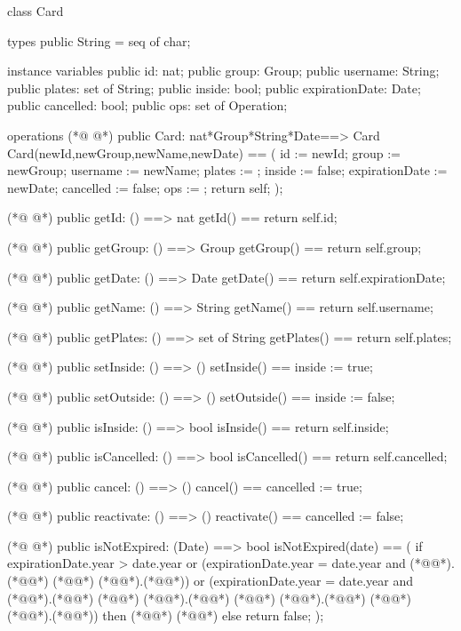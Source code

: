 \begin{vdmpp}[breaklines=true]
class Card

types
public String = seq of char;

instance variables
public id: nat;
public group: Group;
public username: String;
public plates: set of String;
public inside: bool;
public expirationDate: Date;
public cancelled: bool;
public ops: set of Operation;

operations
(*@
\label{Card:17}
@*)
public Card: nat*Group*String*Date==> Card
 Card(newId,newGroup,newName,newDate) == (
  id := newId;
  group := newGroup;
  username := newName;
  plates := {};
  inside := false;
  expirationDate := newDate;
  cancelled := false;
  ops := {};
  return self;
 );
 
(*@
\label{getId:30}
@*)
public getId: () ==> nat
 getId() == return self.id;
 
(*@
\label{getGroup:33}
@*)
public getGroup: () ==> Group
 getGroup() == return self.group;
 
(*@
\label{getDate:36}
@*)
public getDate: () ==> Date
 getDate() == return self.expirationDate;
 
(*@
\label{getName:39}
@*)
public getName: () ==> String
 getName() == return self.username;

(*@
\label{getPlates:42}
@*)
public getPlates: () ==> set of String
 getPlates() == return self.plates;
 
(*@
\label{setInside:45}
@*)
public setInside: () ==> ()
 setInside() == inside := true;
 
(*@
\label{setOutside:48}
@*)
public setOutside: () ==> ()
 setOutside() == inside := false; 
 
(*@
\label{isInside:51}
@*)
public isInside: () ==> bool
 isInside() == return self.inside;
 
(*@
\label{isCancelled:54}
@*)
public isCancelled: () ==> bool
 isCancelled() == return self.cancelled;
 
(*@
\label{cancel:57}
@*)
public cancel: () ==> ()
 cancel() == cancelled := true;
 
(*@
\label{reactivate:60}
@*)
public reactivate: () ==> ()
 reactivate() == cancelled := false;
 
(*@
\label{isNotExpired:63}
@*)
public isNotExpired: (Date) ==> bool
 isNotExpired(date) == (
  if expirationDate.year > date.year or
  (expirationDate.year = date.year and (*@@*).(*@@*) (*@\vdmnotcovered{>}@*) (*@@*).(*@@*)) or
  (expirationDate.year = date.year and (*@@*).(*@@*) (*@\vdmnotcovered{=}@*) (*@@*).(*@@*)
   (*@@*) (*@@*).(*@@*) (*@\vdmnotcovered{>=}@*) (*@@*).(*@@*))
  then (*@@*) (*@@*)
  else return false;
 );
 

\end{vdmpp}
